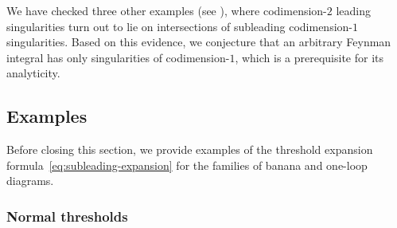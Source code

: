 \documentclass[12pt]{article}
\numberwithin{figure}{section}
\begin{document}
				We have checked three other examples (see \cite[Fig.~1ghi]{Mizera:2021icv}), where codimension-$2$ leading singularities turn out to lie on intersections of subleading codimension-$1$ singularities. Based on this evidence, we conjecture that an arbitrary Feynman integral has only singularities of codimension-$1$, which is a prerequisite for its analyticity.
				
				\subsection{\label{sec:sec7-examples}Examples}
				
			    Before closing this section, we provide examples of the threshold expansion formula~\eqref{eq:subleading-expansion} for the families of banana and one-loop diagrams. 
				
				\subsubsection{\label{sec:threshold-examples}Normal thresholds}
				
\end{document}
